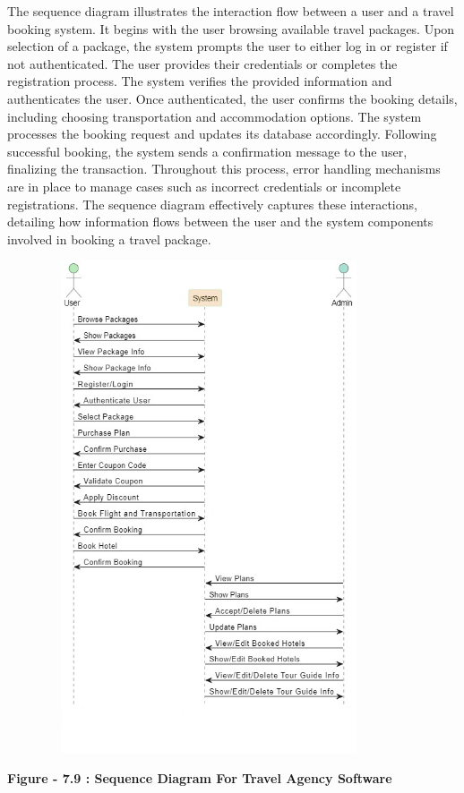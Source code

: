 \documentclass{scrreprt}
\begin{document}
The sequence diagram illustrates the interaction flow between a user and a travel booking system. It begins with the user browsing available travel packages. Upon selection of a package, the system prompts the user to either log in or register if not authenticated. The user provides their credentials or completes the registration process. The system verifies the provided information and authenticates the user. Once authenticated, the user confirms the booking details, including choosing transportation and accommodation options. The system processes the booking request and updates its database accordingly. Following successful booking, the system sends a confirmation message to the user, finalizing the transaction. Throughout this process, error handling mechanisms are in place to manage cases such as incorrect credentials or incomplete registrations. The sequence diagram effectively captures these interactions, detailing how information flows between the user and the system components involved in booking a travel package.

{\includegraphics[width=450px, height=550px]{sqd.jpg}}

\begin{center}
    \parbox{0.8\textwidth}{ 
        \centering
        \textbf{Figure - 7.9 : Sequence Diagram For Travel Agency Software}
    }
\end{center}
\end{document}
